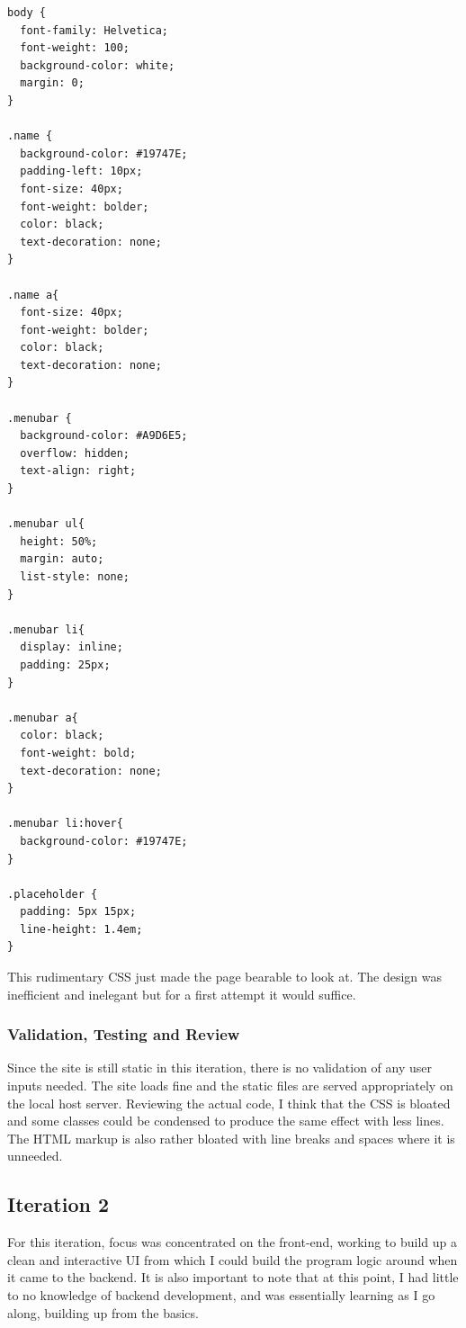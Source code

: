 \documentclass{article}
\begin{document}
\begin{lstlisting}[caption={style.css}]
  body {
  font-family: Helvetica;
  font-weight: 100;
  background-color: white;
  margin: 0;
}

.name {
  background-color: #19747E;
  padding-left: 10px;
  font-size: 40px;
  font-weight: bolder;
  color: black;
  text-decoration: none;
}

.name a{
  font-size: 40px;
  font-weight: bolder;
  color: black;
  text-decoration: none;
}

.menubar {
  background-color: #A9D6E5;
  overflow: hidden;
  text-align: right;
}

.menubar ul{
  height: 50%;
  margin: auto;
  list-style: none;
}

.menubar li{
  display: inline;
  padding: 25px;
}

.menubar a{
  color: black;
  font-weight: bold;
  text-decoration: none;
}

.menubar li:hover{
  background-color: #19747E;
}

.placeholder {
  padding: 5px 15px;
  line-height: 1.4em;
}
\end{lstlisting}

This rudimentary CSS just made the page bearable to look at. The design was inefficient and inelegant but for a first attempt it would suffice. 

\subsubsection{Validation, Testing and Review}

Since the site is still static in this iteration, there is no validation of any user inputs needed. The site loads fine and the static files are served appropriately on the local host server. Reviewing the actual code, I think that the CSS is bloated and some classes could be condensed to produce the same effect with less lines. The HTML markup is also rather bloated with line breaks and spaces where it is unneeded.

\subsection{Iteration 2}

For this iteration, focus was concentrated on the front-end, working to build up a clean and interactive UI from which I could build the program logic around when it came to the backend. It is also important to note that at this point, I had little to no knowledge of backend development, and was essentially learning as I go along, building up from the basics.
\end{document}
